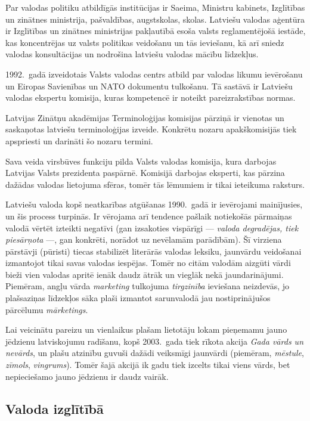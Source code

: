 \begin{multicols}{2}
Par valodas politiku atbildīgās institūcijas ir Saeima, Ministru kabinets, Izglītības un zinātnes ministrija, pašvaldības, augstskolas, skolas. 
Latviešu valodas aģentūra ir Izglītības un zinātnes ministrijas pakļautībā esoša valsts reglamentējošā iestāde, kas koncentrējas uz valsts politikas veidošanu un tās ieviešanu, kā arī sniedz valodas konsultācijas un nodrošina latviešu valodas mācību līdzekļus. 

1992.~gadā izveidotais Valsts valodas centrs atbild par valodas likumu ievērošanu un Eiropas Savienības un NATO dokumentu tulkošanu. 
Tā sastāvā ir Latviešu valodas ekspertu komisija, kuras kompetencē ir noteikt pareizrakstības normas. 

Latvijas Zinātņu akadēmijas Terminoloģijas komisijas pārziņā ir vienotas un saskaņotas latviešu terminoloģijas izveide. 
Konkrētu nozaru apakškomisijās tiek apspriesti un darināti šo nozaru termini.

Sava veida virsbūves funkciju pilda Valsts valodas komisija, kura darbojas Latvijas Valsts prezidenta paspārnē. 
Komisijā darbojas eksperti, kas pārzina dažādas valodas lietojuma sfēras, tomēr tās lēmumiem ir tikai ieteikuma raksturs. 

Latviešu valoda kopš neatkarības atgūšanas 1990.~gadā ir ievērojami mainījusies, un šis process turpinās. 
Ir vērojama arī tendence pašlaik notiekošās pārmaiņas valodā vērtēt izteikti negatīvi (gan izsakoties vispārīgi — \textit{valoda degradējas, tiek piesārņota} —, gan konkrēti, norādot uz nevēlamām parādībām). 
Šī virziena pārstāvji (pūristi) tiecas stabilizēt literārās valodas leksiku, jaunvārdu veidošanai izmantojot tikai savas valodas iespējas. 
Tomēr no citām valodām aizgūti vārdi bieži vien valodas apritē ienāk daudz ātrāk un vieglāk nekā jaundarinājumi. 
Piemēram, angļu vārda \textit{marketing} tulkojuma \textit{tirgzinība} ieviešana neizdevās, jo plašsaziņas līdzekļos sāka plaši izmantot sarunvalodā jau nostiprinājušos pārcēlumu \textit{mārketings}.

Lai veicinātu pareizu un vienlaikus plašam lietotāju lokam pieņemamu jauno jēdzienu latviskojumu radīšanu, kopš 2003.~gada tiek rīkota akcija \textit{Gada vārds un nevārds}, un plašu atzinību guvuši dažādi veiksmīgi jaunvārdi (piemēram, \textit{mēstule}, \textit{zīmols}, \textit{vingrums}). 
Tomēr šajā akcijā ik gadu tiek izcelts tikai viens vārds, bet nepieciešamo jauno jēdzienu ir daudz vairāk.

\subsection{Valoda izglītībā}


\end{multicols}
